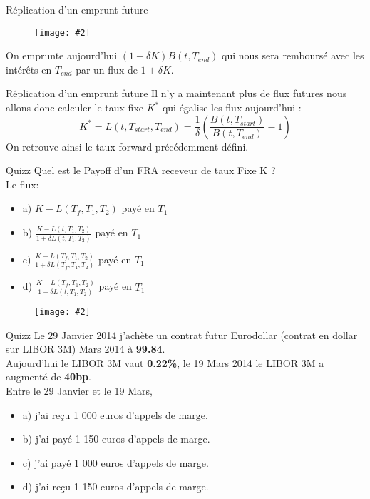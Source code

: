 \documentclass{beamer}
\newcommand{\FIG}[2]{\texttt{[image: \#2]}}
\begin{document}
\begin{frame}{Réplication d'un emprunt future}
\begin{center}
\begin{figure}[h]
\FIG{4in}{figures/fwd_replic3.png}
\end{figure}
\end{center}
On emprunte aujourd'hui $(1+\delta K)B(t,T_{end})$ qui nous sera remboursé avec les intérêts en $T_{end}$ par un flux de $1+\delta K$.
\end{frame}

\begin{frame}{Réplication d'un emprunt future}
Il n'y a maintenant plus de flux futures nous allons donc calculer le taux fixe $K^*$ qui égalise les flux aujourd'hui :
\[
K^*=L(t,T_{start}, T_{end})=\frac{1}{\delta}\left(\frac{B(t,T_{start})}{B(t,T_{end})}-1\right)
\]
On retrouve ainsi le taux forward précédemment défini.
\end{frame}

\begin{frame}{Quizz}
Quel est le Payoff d'un FRA receveur de taux Fixe K ?\\
\vspace{0.5cm}
Le flux:
\begin{itemize}
\item a) $K - L(T_f,T_{1},T_{2})$ payé en $T_1$
\item b) $\frac{K - L(t,T_{1},T_{2})}{1+\delta  L(t,T_{1},T_{2})}$ payé en $T_1$
\item c) $\frac{K - L(T_f,T_{1},T_{2})}{1+\delta  L(T_f,T_{1},T_{2})}$ payé en $T_1$
\item d) $\frac{K - L(T_f,T_{1},T_{2})}{1+\delta  L(t,T_{1},T_{2})}$ payé en $T_1$
\end{itemize}
\begin{figure}[h]
\FIG{10cm}{figures/schema_fra.jpg}
\end{figure}

\end{frame}

\begin{frame}{Quizz}
Le 29 Janvier 2014 j'achète un contrat futur Eurodollar (contrat en dollar sur LIBOR 3M) Mars 2014 à \textbf{99.84}.\\
Aujourd'hui le LIBOR 3M vaut \textbf{0.22\%}, le 19 Mars 2014 le LIBOR 3M a augmenté de \textbf{40bp}.\\
\vspace{0.5cm}
Entre le 29 Janvier et le 19 Mars,\\
\begin{itemize}
\item a) j'ai reçu 1 000 euros d'appels de marge.
\item b) j'ai payé 1 150 euros d'appels de marge.
\item c) j'ai payé 1 000 euros d'appels de marge.
\item d) j'ai reçu 1 150 euros d'appels de marge.
\end{itemize}
\end{frame}
\end{document}
